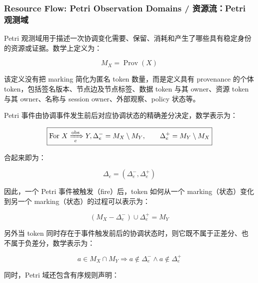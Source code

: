   \subsubsection{Resource Flow: Petri Observation Domains / 资源流：Petri 观测域}

  Petri 观测域用于描述一次协调变化需要、保留、消耗和产生了哪些具有稳定身份的资源或证据。数学上定义为：

  \begin{equation}
    \boxed{
      M_X=\operatorname{Prov}(X)
    }
    \label{eq:petri-provenance-marking}
  \end{equation}

  该定义没有把 marking 简化为匿名 token 数量，而是定义具有 provenance 的个体 token，包括签名版本、节点边及节点标签、数据 token 与其 owner、资源 token 与其 owner、名称与 session owner、外部观察、policy 状态等。

  Petri 事件由协调事件发生前后对应协调状态的精确差分决定，数学表示为：

  \begin{equation}
    \boxed{\text{For} \ X\xRightarrow[e]{\mathrm{obs}}Y,
      \Delta_e^- = M_X\setminus M_Y,
      \qquad
      \Delta_e^+ = M_Y\setminus M_X
    }
    \label{eq:petri-event-token-differences}
  \end{equation}

  合起来即为：

  \begin{equation}
    \boxed{
      \Delta_e=(\Delta^-_e,\Delta^+_e)
    }
    \label{eq:petri-event-delta}
  \end{equation}

  因此，一个 Petri 事件被触发（fire）后，token 如何从一个 marking（状态）变化到另一个 marking（状态）的过程可以表示为：

  \begin{equation}
    \boxed{
      (M_X-\Delta^-_e) \cup \Delta^+_e = M_Y
    }
    \label{eq:petri-firing-update}
  \end{equation}

  另外当 token 同时存在于事件触发前后的协调状态时，则它既不属于正差分、也不属于负差分，数学表示为：

  \begin{equation}
    \boxed{
      a\in M_X\cap M_Y
      \Longrightarrow
      a\notin\Delta_e^-
      \land
      a\notin\Delta_e^+
    }
    \label{eq:petri-preserved-token}
  \end{equation}

  同时，Petri 域还包含有序规则声明：

